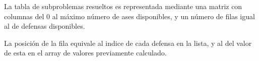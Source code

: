 La tabla de subproblemas resueltos es representada mediante una matriz con columnas del 0 al máximo número de ases disponibles, y un número de filas igual al de defensas disponibles.

La posición de la fila equivale al indice de cada defensa en la lista, y al del valor de esta en el array de valores previamente calculado.
